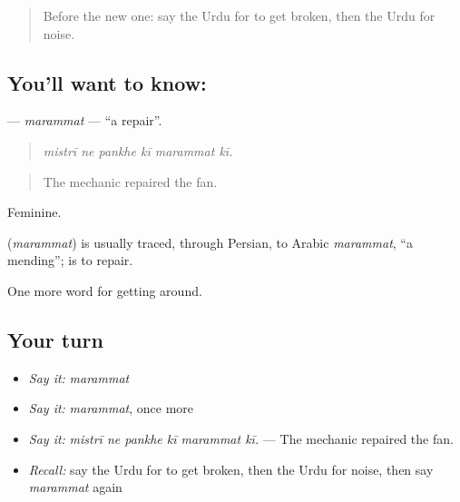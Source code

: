 \label{lesson:UR-C407-marammat}



\begin{quote}
Before the new one: say the Urdu for to get broken, then the Urdu for noise.
\end{quote}

\subsection*{You'll want to know: }
\textbf{} — \emph{marammat} — \textquotedblleft{}a repair\textquotedblright{}.

\begin{quote}
     
\end{quote}

\begin{quote}
\emph{mistrī ne pankhe kī marammat kī.}
\end{quote}

\begin{quote}
The mechanic repaired the fan.
\end{quote}

Feminine.

\begin{cousinweb}
\textbf{} (\emph{marammat}) is usually traced, through Persian, to Arabic \emph{marammat}, \textquotedblleft{}a mending\textquotedblright{}; \textbf{ } is to repair.
\end{cousinweb}

\begin{grammarlens}[title={What you've built}]
One more word for getting around.
\end{grammarlens}

\subsection*{Your turn}
\begin{itemize}
\raggedright
  \item \emph{Say it:} \emph{marammat}
  \item \emph{Say it:} \emph{marammat}, once more
  \item \emph{Say it:} \emph{mistrī ne pankhe kī marammat kī.} — The mechanic repaired the fan.
  \item \emph{Recall:} say the Urdu for to get broken, then the Urdu for noise, then say \emph{marammat} again
\end{itemize}

